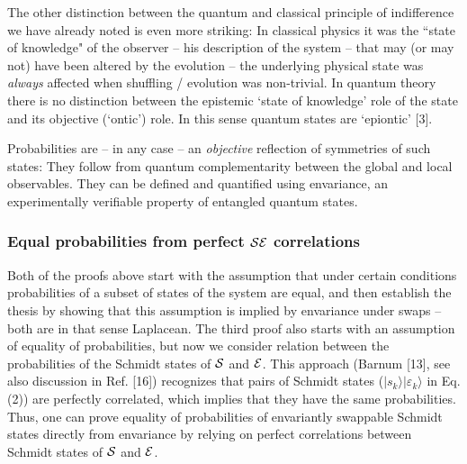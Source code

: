 \documentclass[aps,pra,epsfig,11pt,floatfix]{revtex4}
\begin{document}
The other distinction between the quantum and classical principle of indifference 
we have already noted is even more striking: In classical physics it was the
``state of knowledge" of the observer -- his description of the system -- that may 
(or may not) have been altered by the evolution -- the underlying physical state 
was {\it always} affected when shuffling / evolution was non-trivial.
In quantum theory there is no distinction between the epistemic `state of
knowledge' role of the state and its objective (`ontic') role. In this sense quantum 
states are `epiontic' [3]. 

Probabilities are -- in any case -- an {\it objective} reflection of symmetries of 
such states: They follow from quantum complementarity between the global
and local observables. They can be defined and quantified using envariance, 
an experimentally verifiable property of entangled quantum states.

\subsubsection{Equal probabilities from perfect ${\cal SE}$ correlations}

Both of the proofs above start with the assumption that under certain conditions
probabilities of a subset of states of the system are equal, and then establish
the thesis by showing that this assumption is implied by envariance under swaps
-- both are in that sense Laplacean. The third proof also starts with
an assumption of equality of probabilities, but now we consider relation
between the probabilities of the Schmidt states of ${\cal S}$ and ${\cal E}$.
This approach (Barnum [13], see also discussion in Ref. [16])
recognizes that pairs of Schmidt states ($|s_k\rangle|\varepsilon_k\rangle$
in Eq. (2)) are perfectly correlated, which implies that they have the same
probabilities. Thus, one can prove equality of probabilities
of envariantly swappable Schmidt states directly from envariance by relying
on perfect correlations between Schmidt states of ${\cal S}$ and ${\cal E}$.
\end{document}
